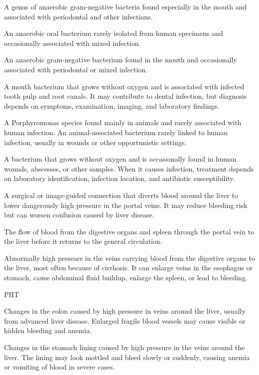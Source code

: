  A genus of anaerobic gram-negative bacteria found especially in the mouth and associated with periodontal and other infections.

 An anaerobic oral bacterium rarely isolated from human specimens and occasionally associated with mixed infection.

 An anaerobic gram-negative bacterium found in the mouth and occasionally associated with periodontal or mixed infection.

 A mouth bacterium that grows without oxygen and is associated with infected tooth pulp and root canals. It may contribute to dental infection, but diagnosis depends on symptoms, examination, imaging, and laboratory findings.

 A Porphyromonas species found mainly in animals and rarely associated with human infection. An animal-associated bacterium rarely linked to human infection, usually in wounds or other opportunistic settings.

 A bacterium that grows without oxygen and is occasionally found in human wounds, abscesses, or other samples. When it causes infection, treatment depends on laboratory identification, infection location, and antibiotic susceptibility.

 A surgical or image-guided connection that diverts blood around the liver to lower dangerously high pressure in the portal veins. It may reduce bleeding risk but can worsen confusion caused by liver disease.

 The flow of blood from the digestive organs and spleen through the portal vein to the liver before it returns to the general circulation.

 Abnormally high pressure in the veins carrying blood from the digestive organs to the liver, most often because of cirrhosis. It can enlarge veins in the esophagus or stomach, cause abdominal fluid buildup, enlarge the spleen, or lead to bleeding.

\synonyms
PHT

 Changes in the colon caused by high pressure in veins around the liver, usually from advanced liver disease. Enlarged fragile blood vessels may cause visible or hidden bleeding and anemia.

 Changes in the stomach lining caused by high pressure in the veins around the liver. The lining may look mottled and bleed slowly or suddenly, causing anemia or vomiting of blood in severe cases.

